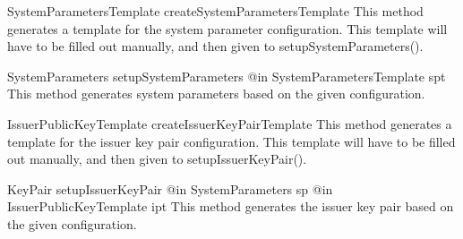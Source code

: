 
      \begin{method}
      {SystemParametersTemplate}
      {createSystemParametersTemplate}
      {
      }
      This method generates a template for the system parameter configuration.
      This template will have to be filled out manually, and then given to setupSystemParameters().
      \end{method}
      
      \begin{method}
      {SystemParameters}
      {setupSystemParameters}
      {
        {@in SystemParametersTemplate spt}
      }
      This method generates system parameters based on the given configuration.
      \end{method}
      
      \begin{method}
      {IssuerPublicKeyTemplate}
      {createIssuerKeyPairTemplate}
      {
      }
      This method generates a template for the issuer key pair configuration.
      This template will have to be filled out manually, and then given to setupIssuerKeyPair().
      \end{method}
      
      \begin{method}
      {KeyPair}
      {setupIssuerKeyPair}
      {
        {@in SystemParameters sp}
        {@in IssuerPublicKeyTemplate ipt}
      }
      This method generates the issuer key pair based on the given configuration.
      \end{method}
      
